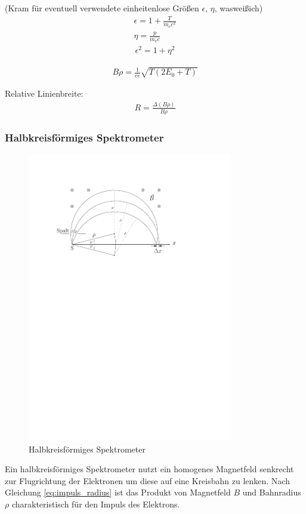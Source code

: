 \documentclass[11pt, a4paper]{article}
\numberwithin{equation}{section}
\begin{document}
(Kram für eventuell verwendete einheitenlose Größen $\epsilon$, $\eta$, wasweißich)
\begin{align}
	\epsilon = 1 + \frac{T}{m_\mathrm{e} c^2} \\
	\eta = \frac{p}{m_\mathrm{e} c}
\end{align}
\begin{align}
	\epsilon^2 = 1 + \eta^2
\end{align}

\begin{align}
	B \rho = \frac{1}{c e} \sqrt{T \left( 2 E_0 + T \right)}
	\label{eq:b_rho}
\end{align}

Relative Linienbreite:
\begin{align}
	R = \frac{\Delta (B \rho)}{B \rho}
	\label{eq:rel_linienbreite}
\end{align}

\subsubsection{Halbkreisförmiges Spektrometer}
\begin{figure}[h]
	\centering
	\includegraphics[width=0.8\textwidth]{./figures/semicircular_spectrometer.pdf}
	\caption{Halbkreisförmiges Spektrometer}
	\label{fig:semicirc_spectro}
\end{figure}
Ein halbkreisförmiges Spektrometer nutzt ein homogenes Magnetfeld senkrecht zur Flugrichtung der Elektronen um diese auf eine Kreisbahn zu lenken.
Nach Gleichung \eqref{eq:impuls_radius} ist das Produkt von Magnetfeld $B$ und Bahnradius $\rho$ charakteristisch für den Impuls des Elektrons.
\end{document}
